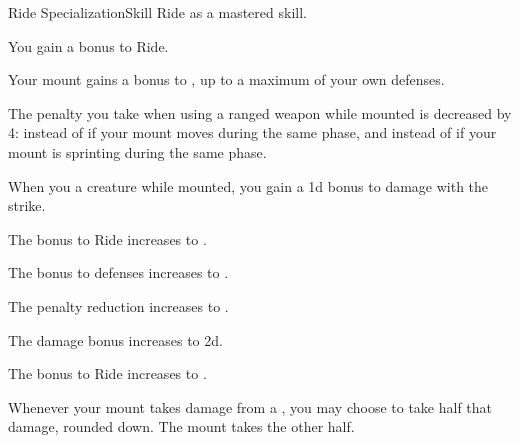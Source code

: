     \begin{feat}{Ride Specialization}{Skill}
        \featpre Ride as a mastered skill.
        \featben

         You gain a  bonus to Ride.

         Your mount gains a  bonus to , up to a maximum of your own defenses.

         The penalty you take when using a ranged weapon while mounted is decreased by 4:  instead of  if your mount moves during the same phase, and  instead of  if your mount is sprinting during the same phase.

         When you  a creature while mounted, you gain a \plus1d bonus to damage with the strike.

         The bonus to Ride increases to .

         The bonus to defenses increases to .

         The penalty reduction increases to .

         The damage bonus increases to \plus2d.

         The bonus to Ride increases to .

         Whenever your mount takes damage from a , you may choose to take half that damage, rounded down.
        The mount takes the other half.
    \end{feat}

